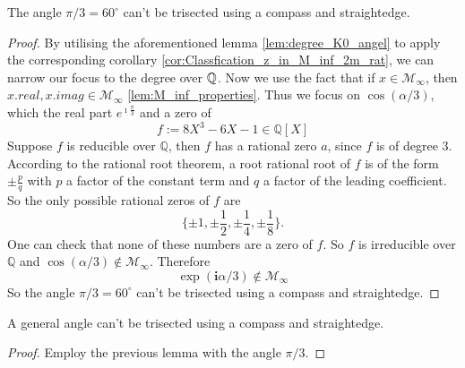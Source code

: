 \begin{lemma}
    \label{lem:pi_third_not_in_M_inf}
    \leanok
    The angle $\pi / 3 = 60^{\circ}$ can't be trisected using a compass and straightedge.
\end{lemma}
\begin{proof}
    By utilising the aforementioned lemma \ref{lem:degree_K0_angel} to apply the corresponding corollary \ref{cor:Classfication_z_in_M_inf_2m_rat}, we can narrow our focus to the degree over $\mathbb{Q}$.
    Now we use the fact that if $x\in \mathcal{M}_{\infty}$, then $x.real, x.imag \in \mathcal{M}_{\infty}$ \ref{lem:M_inf_properties}. 
    Thus we focus on $\cos(\alpha/3)$, which the real part $e^{\imath \frac{\pi}{3}}$ and a zero of
    \begin{equation*}
        f := 8 X^3 - 6 X - 1 \in \mathbb{Q}[X]
    \end{equation*}
    Suppose $f$ is reducible over $\mathbb{Q}$, then $f$ has a rational zero $a$, since $f$ is of degree $3$. According to the rational root theorem, a root rational root of $f$ is of the form $\pm \frac{p}{q}$ with $p$ a factor of the constant term and $q$ a factor of the leading coefficient. So the only possible rational zeros of $f$ are
     \begin{equation*}
        \{ \pm 1, \pm \frac{1}{2}, \pm \frac{1}{4}, \pm \frac{1}{8} \}.
     \end{equation*}
     One can check that none of these numbers are a zero of $f$.
     So $f$ is irreducible over $\mathbb{Q}$ and $\cos(\alpha/3) \notin \mathcal{M}_{\infty}$.
     Therefore
        \begin{equation*}
            \exp(\textbf{i} \alpha/3) \notin \mathcal{M}_{\infty}
        \end{equation*}
    So the angle $\pi / 3 = 60^{\circ}$ can't be trisected using a compass and straightedge.
\end{proof}

\begin{theorem}
    \label{thm:Angle_not_Trisectable}
    \leanok
    A general angle can't be trisected using a compass and straightedge.
\end{theorem}
\begin{proof}
    \leanok
    Employ the previous lemma with the angle $\pi / 3$.
\end{proof}